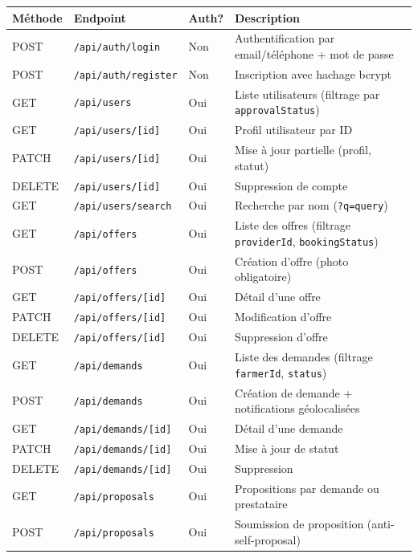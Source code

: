 \documentclass[12pt, a4paper]{article}
\begin{document}
\begin{longtable}{l l l p{5cm}}
\toprule
\textbf{Méthode} & \textbf{Endpoint} & \textbf{Auth?} & \textbf{Description} \\
\midrule
\endhead
POST & \texttt{/api/auth/login}          & Non & Authentification par email/téléphone + mot de passe \\
POST & \texttt{/api/auth/register}        & Non & Inscription avec hachage bcrypt \\
\midrule
GET  & \texttt{/api/users}               & Oui & Liste utilisateurs (filtrage par \texttt{approvalStatus}) \\
GET  & \texttt{/api/users/[id]}          & Oui & Profil utilisateur par ID \\
PATCH & \texttt{/api/users/[id]}         & Oui & Mise à jour partielle (profil, statut) \\
DELETE & \texttt{/api/users/[id]}        & Oui & Suppression de compte \\
GET  & \texttt{/api/users/search}        & Oui & Recherche par nom (\texttt{?q=query}) \\
\midrule
GET  & \texttt{/api/offers}              & Oui & Liste des offres (filtrage \texttt{providerId}, \texttt{bookingStatus}) \\
POST & \texttt{/api/offers}              & Oui & Création d'offre (photo obligatoire) \\
GET  & \texttt{/api/offers/[id]}         & Oui & Détail d'une offre \\
PATCH & \texttt{/api/offers/[id]}        & Oui & Modification d'offre \\
DELETE & \texttt{/api/offers/[id]}       & Oui & Suppression d'offre \\
\midrule
GET  & \texttt{/api/demands}             & Oui & Liste des demandes (filtrage \texttt{farmerId}, \texttt{status}) \\
POST & \texttt{/api/demands}             & Oui & Création de demande + notifications géolocalisées \\
GET  & \texttt{/api/demands/[id]}        & Oui & Détail d'une demande \\
PATCH & \texttt{/api/demands/[id]}       & Oui & Mise à jour de statut \\
DELETE & \texttt{/api/demands/[id]}      & Oui & Suppression \\
\midrule
GET  & \texttt{/api/proposals}           & Oui & Propositions par demande ou prestataire \\
POST & \texttt{/api/proposals}           & Oui & Soumission de proposition (anti-self-proposal) \\

\end{longtable}
\end{document}
